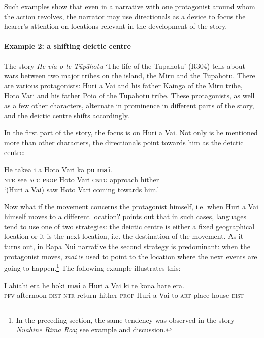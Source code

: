 Such examples show that even in a narrative with one protagonist around whom the action revolves, the narrator may use directionals as a device to focus the hearer’s attention on locations relevant in the development of the story.

\paragraph{Example 2: a shifting deictic centre}\label{sec:7.5.1.2.2}

The story \textit{He via o te Tūpāhotu} ‘The life of the Tupahotu’ (R304) tells about wars between two major tribes on the island, the Miru and the Tupahotu. There are various protagonists: Huri a Vai and his father Kainga of the Miru tribe, Hoto Vari and his father Poio of the Tupahotu tribe. These protagonists, as well as a few other characters, alternate in prominence in different parts of the story, and the deictic centre shifts accordingly.

In the first part of the story, the focus is on Huri a Vai. Not only is he mentioned more than other characters, the directionals point towards him as the deictic centre:

\ea\label{ex:7.137}
\gll He take{\ꞌ}a i a Hoto Vari ka pū \textbf{mai}. \\
\textsc{ntr} see \textsc{acc} \textsc{prop} Hoto Vari \textsc{cntg} approach hither \\

\glt
‘(Huri a Vai) saw Hoto Vari coming towards him.’ \textstyleExampleref{[R304.004]} 
\z

Now what if the movement concerns the protagonist himself, i.e. when Huri a Vai himself moves to a different location? \citet[142–143]{Levinsohn2007} points out that in such cases, languages tend to use one of two strategies: the deictic centre is either a fixed geographical location or it is the next location, i.e. the destination of the movement. As it turns out, in Rapa Nui narrative the second strategy is predominant: when the protagonist moves, \textit{mai} is used to point to the location where the next events are going to happen.\footnote{\label{fn:355}In the preceding section, the same tendency was observed in the story \textit{Nuahine Rima Roa}; see example  and discussion.} The following example illustrates this:

\ea\label{ex:7.138}
\gll I ahiahi era he hoki \textbf{mai} a Huri {\ꞌ}a Vai ki te kona hare era. \\
\textsc{pfv} afternoon \textsc{dist} \textsc{ntr} return hither \textsc{prop} Huri a Vai to \textsc{art} place house \textsc{dist} \\

